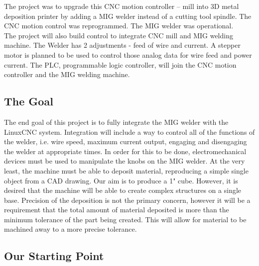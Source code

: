 \documentclass[12pt]{article}
\newlength\tindent
\renewcommand{\indent}{\hspace*{\tindent}}
\begin{document}
\indent The project was to upgrade this CNC motion controller – mill into 3D metal deposition printer by adding a MIG welder instead of a cutting tool spindle. The CNC motion control was reprogrammed. The MIG welder was operational.\\
\indent The project will also build control to integrate CNC mill and MIG welding machine. The Welder has 2 adjustments - feed of wire and current. A stepper motor is planned to be used to control those analog data for wire feed and power current. The PLC, programmable logic controller, will join the CNC motion controller and the MIG welding machine.

\clearpage

\subsection{The Goal}
\indent The end goal of this project is to fully integrate the MIG welder with the LinuxCNC system. Integration will include a way to control all of the functions of the welder, i.e. wire speed, maximum current output, engaging and disengaging the welder at appropriate times. In order for this to be done, electromechanical devices must be used to manipulate the knobs on the MIG welder. At the very least, the machine must be able to deposit material, reproducing a simple single object from a CAD drawing. Our aim is to  produce a 1" cube. However, it is desired that the machine will be able to create complex structures on a single base. Precision of the deposition is not the primary concern, however it will be a requirement that the total amount of material deposited is more than the minimum tolerance of the part being created. This will allow for material to be machined away to a more precise tolerance.

\subsection{Our Starting Point}
\end{document}

